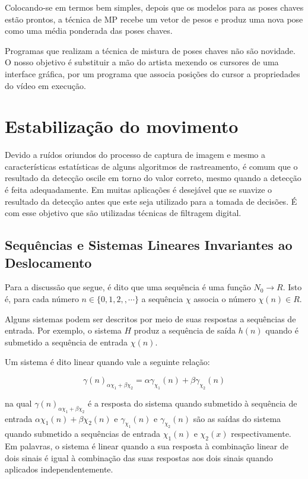 {Colocando-se em termos bem simples, depois que os modelos para as poses chaves estão prontos, a técnica de MP recebe um vetor de pesos e produz uma nova pose como uma média ponderada das poses chaves.

	Programas que realizam a técnica de mistura de poses chaves não são novidade. O nosso objetivo é substituir a mão do artista mexendo os cursores de uma interface gráfica, por um programa que associa posições do cursor a propriedades do vídeo em execução.


\section{Estabilização do movimento}

Devido a ruídos oriundos do processo de captura de imagem e mesmo a
características estatísticas de alguns algoritmos de rastreamento, é comum que o
resultado da detecção oscile em torno do valor correto, mesmo quando a detecção é
feita adequadamente. Em muitas aplicações é desejável que se suavize o resultado
da detecção antes que este seja utilizado para a tomada de decisões. É com esse
objetivo que são utilizadas técnicas de filtragem digital. 

\subsection{Sequências e Sistemas Lineares Invariantes ao Deslocamento}
 
Para a discussão que segue, é dito que uma sequência é uma função 
$N_0 \rightarrow R$. Isto é, para cada número $n\in \{0,1,2,,\cdots\}$ a
sequência $\chi$ associa o número $\chi(n) \in R$.

Alguns sistemas podem ser descritos por meio de suas respostas a sequências de
entrada. Por exemplo, o sistema $H$  produz a sequência de saída
$h(n)$ quando é submetido a sequência de entrada $\chi(n)$.

Um sistema é dito linear quando vale a seguinte relação:

\begin{equation}
\gamma(n)_{\alpha \chi_1 + \beta \chi_2} = \alpha \gamma_{\chi_1}(n) + \beta \gamma_{\chi_2}(n)
\end{equation}

na qual $\gamma(n)_{\alpha \chi_1 + \beta \chi_2}$ é a resposta do sistema quando submetido à
sequência de entrada $\alpha \chi_1(n) + \beta \chi_2(n)$ e $\gamma_{\chi_1}(n)$ e
$\gamma_{\chi_2}(n)$ são as saídas do sistema quando submetido a sequências de entrada
$\chi_1(n)$ e $\chi_2(x)$ respectivamente. Em palavras, o sistema é linear quando a
sua resposta à combinação linear de dois sinais é igual à combinação das
suas respostas aos dois sinais quando aplicados independentemente. 

}
